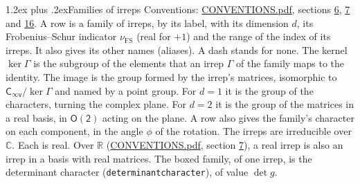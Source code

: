 \documentclass[10pt,a4paper]{article}
\makeatletter
\renewcommand\section{\@startsection{section}{1}{\z@}{-3ex plus -1ex minus -.2ex}%
  {1.2ex plus .2ex}{\normalfont\large\sffamily\bfseries\color{parttitle}}}
\numberwithin{equation}{section}
\newcommand{\grp}[1]{\mathsf{#1}}
\newcommand{\fsind}{\nu_{\mathrm{FS}}}
\makeatother
\begin{document}
\section{Families of irreps}\label{s:families}
Conventions: \href{../../CONVENTIONS.pdf}{CONVENTIONS.pdf}, sections \href{../../CONVENTIONS.pdf\#conv.6}{6}, \href{../../CONVENTIONS.pdf\#conv.7}{7} and \href{../../CONVENTIONS.pdf\#conv.16}{16}.
\leavevmode\label{n:index.dimension}\label{n:index.frobenius}\label{n:index.family}\label{n:head.family.irreps}\label{n:head.index.family}A row is a family of irreps, by its label, with its dimension $d$, its Frobenius--Schur indicator $\fsind$ (real for $+1$) and the range of the index of its irreps. \label{n:head.aliases}\label{n:irrep.alias.greek}It also gives its other names (aliases). A dash stands for none. \label{n:irrep.Gamma}\label{n:head.kernel}The kernel $\ker\Gamma$ is the subgroup of the elements that an irrep $\Gamma$ of the family maps to the identity. \label{n:head.image}The image is the group formed by the irrep's matrices, isomorphic to $\grp{C_{\infty v}}/\ker\Gamma$ and named by a point group. For $d = 1$ it is the group of the characters, turning the complex plane. For $d = 2$ it is the group of the matrices in a real basis, in $\grp{O(2)}$ acting on the plane. A row also gives the family's character on each component, in the angle $\phi$ of the rotation. The irreps are irreducible over $\mathbb{C}$. Each is real. Over $\mathbb{R}$ (\href{../../CONVENTIONS.pdf}{CONVENTIONS.pdf}, section \href{../../CONVENTIONS.pdf\#conv.7}{7}), a real irrep is also an irrep in a basis with real matrices. \label{n:mark.determinant}The boxed family, of one irrep, is the determinant character (\texttt{determinantcharacter}), of value $\det g$.
\end{document}
